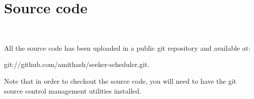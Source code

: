 \chapter{Source code}~\label{app:source}

All the source code has been uploaded in a public git repository and available
at:

git://github.com/amithash/seeker-scheduler.git. 


Note that in order to checkout the source code, you will need to have the git source control management
utilities installed.

